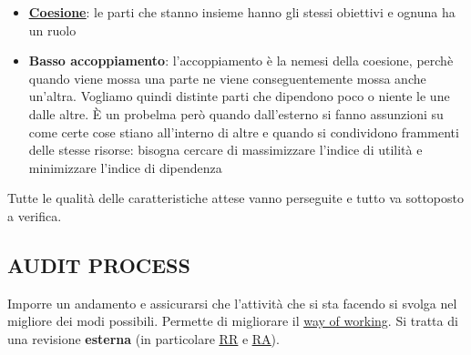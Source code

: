 \begin{itemize}
			\item \textbf{\underline{\hyperref[coeso]{Coesione}}}: le parti che stanno insieme hanno gli stessi obiettivi e ognuna ha un ruolo
			\item \textbf{Basso accoppiamento}: l'accoppiamento è la nemesi della coesione, perchè quando viene mossa una parte ne viene conseguentemente mossa anche un'altra. Vogliamo quindi distinte parti che dipendono poco o niente le une dalle altre. È un probelma  però quando dall'esterno si fanno assunzioni su come certe cose stiano all'interno di altre e quando si condividono frammenti delle stesse risorse: bisogna cercare di massimizzare l'indice di utilità e minimizzare l'indice di dipendenza
		\end{itemize}
		Tutte le qualità delle caratteristiche attese vanno perseguite e %
		tutto va sottoposto a verifica.

		\subsection{AUDIT PROCESS}  \label{audit}
		Imporre un andamento e assicurarsi che l'attività che si sta facendo si svolga nel migliore dei modi possibili. Permette di migliorare il \underline{\hyperref[way]{way of working}}. Si tratta di una revisione \textbf{esterna} (in particolare \underline{\hyperref[RR]{RR}} e \underline{\hyperref[RA]{RA}}).
